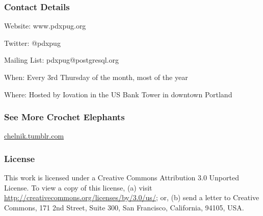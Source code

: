 \documentclass{beamer}
\begin{document}
\frame
{
  \frametitle{Contact Details}

  Website: www.pdxpug.org

  Twitter: @pdxpug

  Mailing List: pdxpug@postgresql.org

  When: Every 3rd Thursday of the month, most of the year

  Where: Hosted by Iovation in the US Bank Tower in downtown Portland
}

\frame
{
  \frametitle{See More Crochet Elephants}

  \begin{center}
    \huge \url{chelnik.tumblr.com}
  \end{center}
}


\frame
{
  \frametitle{License}

  This work is licensed under a Creative Commons Attribution 3.0
  Unported License. To view a copy of this license, (a) visit
  \url{http://creativecommons.org/licenses/by/3.0/us/}; or, (b) send a
  letter to Creative Commons, 171 2nd Street, Suite 300, San Francisco,
  California, 94105, USA.
}
\end{document}
